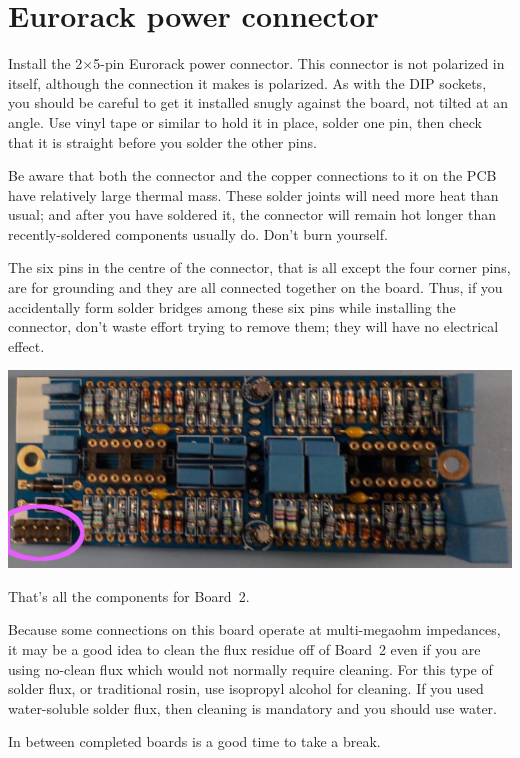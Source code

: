 \section{Eurorack power connector}

Install the 2$\times$5-pin Eurorack power connector.  This connector is not
polarized in itself, although the connection it makes is polarized.  As with
the DIP sockets, you should be careful to get it installed snugly against
the board, not tilted at an angle.  Use vinyl tape or similar to hold it in
place, solder one pin, then check that it is straight before you solder the
other pins.

Be aware that both the connector and the copper connections to it on the PCB
have relatively large thermal mass.  These solder joints will need more
heat than usual; and after you have soldered it, the connector will remain
hot longer than recently-soldered components usually do.  Don't burn
yourself.

The six pins in the centre of the connector, that is all except the four
corner pins, are for grounding and they are all connected together on the
board.  Thus, if you accidentally form solder bridges among these six pins
while installing the connector, don't waste effort trying to remove them;
they will have no electrical effect.

\noindent\includegraphics[width=\linewidth]{powerC.jpg}

That's all the components for Board~2.

Because some connections on this board operate at multi-megaohm impedances,
it may be a good idea to clean the flux residue off of Board~2 even if you
are using no-clean flux which would not normally require cleaning.  For
this type of solder flux, or traditional rosin, use isopropyl alcohol for
cleaning.  If you used water-soluble solder flux, then cleaning is
mandatory and you should use water.

In between completed boards is a good time to take a break.
